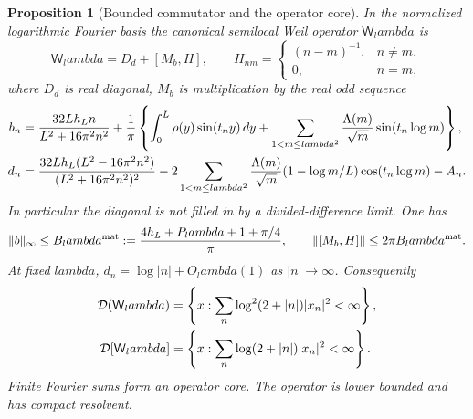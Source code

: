 \documentclass[11pt]{article}
\def\lambda{lambda}%
\newtheorem{proposition}[theorem]{Proposition}
\theoremstyle{remark}
\begin{document}
\begin{proposition}[Bounded commutator and the operator core]
\label{prop:v114-weil-core}
In the normalized logarithmic Fourier basis the canonical semilocal
Weil operator $\mathsf W_\lambda$ is
\begin{equation}\label{eq:v114-weil-decomposition}
 \mathsf W_\lambda=D_d+[M_b,H],\qquad
 H_{nm}=\begin{cases}(n-m)^{-1},&n\ne m,\\0,&n=m,\end{cases}
\end{equation}
where $D_d$ is real diagonal, $M_b$ is multiplication by the real odd
sequence
\begin{align}
 b_n={}&\frac{32Lh_Ln}{L^2+16\pi^2n^2}
 +\frac1\pi\left\{\int_0^L\rho(y)\sin(t_ny)\,dy
 +\sum_{1<m\le\lambda^2}\frac{\Lambda(m)}{\sqrt m}
                         \sin(t_n\log m)\right\},\notag\\
 d_n={}&\frac{32Lh_L(L^2-16\pi^2n^2)}{(L^2+16\pi^2n^2)^2}
 -2\sum_{1<m\le\lambda^2}\frac{\Lambda(m)}{\sqrt m}
        (1-\log m/L)\cos(t_n\log m)-A_n.
 \label{eq:v114-b-d}
\end{align}
In particular the diagonal is not filled in by a divided-difference limit.
One has
\begin{equation}\label{eq:v114-b-bound}
 \|b\|_\infty\le B_\lambda^{\rm mat}
 :=\frac{4h_L+P_\lambda+1+\pi/4}{\pi},\qquad
 \|[M_b,H]\|\le2\pi B_\lambda^{\rm mat}.
\end{equation}
At fixed $\lambda$, $d_n=\log|n|+O_\lambda(1)$ as $|n|\to\infty$.
Consequently
\begin{align}
 \mathcal D(\mathsf W_\lambda)
 &=\left\{x:\sum_n\log^2(2+|n|)|x_n|^2<\infty\right\},\notag\\
 \mathcal D[\mathsf W_\lambda]
 &=\left\{x:\sum_n\log(2+|n|)|x_n|^2<\infty\right\}.
 \label{eq:v114-weil-domains}
\end{align}
Finite Fourier sums form an operator core. The operator is lower bounded
and has compact resolvent.
\end{proposition}
\end{document}
